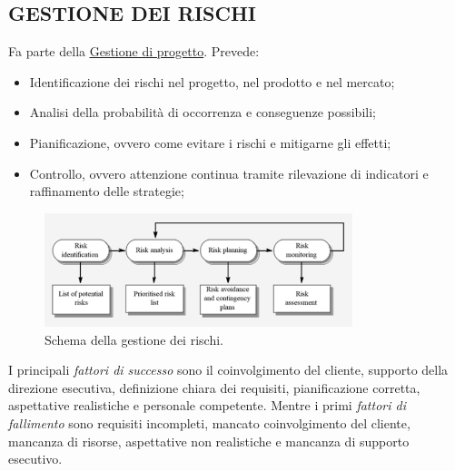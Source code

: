 		\subsection{GESTIONE DEI RISCHI}  \label{gestionerischi}
		Fa parte della \underline{\hyperref[gestioneprogetto]{Gestione di progetto}}. Prevede:
			\begin{itemize}
				\item Identificazione dei rischi nel progetto, nel prodotto e nel mercato;
				\item Analisi della probabilità di occorrenza e conseguenze possibili;
				\item Pianificazione, ovvero come evitare i rischi e mitigarne gli effetti;
				\item Controllo, ovvero attenzione continua tramite rilevazione di indicatori e raffinamento delle strategie;
			\end{itemize}
		\begin{figure}[H]
			\centering
			\includegraphics[width=0.8\textwidth]{img/rischi}		
			\caption{Schema della gestione dei rischi.}
		\end{figure} 
		I principali \textit{fattori di successo} sono il coinvolgimento del cliente, supporto della direzione esecutiva, definizione chiara dei requisiti, pianificazione corretta, aspettative realistiche e personale competente. Mentre i primi \textit{fattori di fallimento} sono requisiti incompleti, mancato coinvolgimento del cliente, mancanza di risorse, aspettative non realistiche e mancanza di supporto  esecutivo.
		
		
